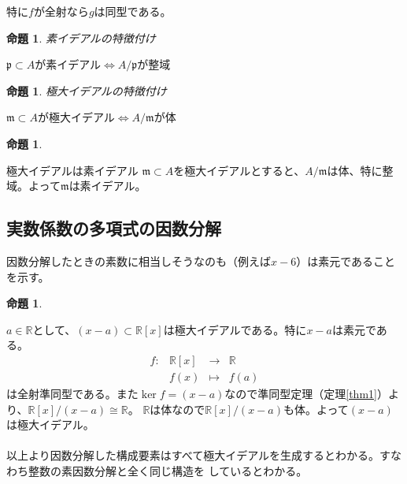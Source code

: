 \documentclass{jsarticle}
\newtheorem{prop}[definition]{命題}
\begin{document}
特に$f$が全射なら$g$は同型である。
\begin{prop}
    素イデアルの特徴付け
\end{prop}
$\mathfrak{p}\subset A$が素イデアル$\Longleftrightarrow A/\mathfrak{p}$が整域
\begin{prop}
    極大イデアルの特徴付け
\end{prop}
$\mathfrak{m}\subset A$が極大イデアル$\Longleftrightarrow A/\mathfrak{m}$が体
\begin{prop}
\end{prop}
極大イデアルは素イデアル
\proof
$\mathfrak{m} \subset A$を極大イデアルとすると、$A/\mathfrak{m}$は体、特に整域。よって$\mathfrak{m}$は素イデアル。
\subsection{実数係数の多項式の因数分解}
因数分解したときの素数に相当しそうなのも（例えば$x-6$）は素元であることを示す。
\begin{prop}
\end{prop}
$a\in \mathbb{R}$として、$(x-a)\subset \mathbb{R}[x]$は極大イデアルである。特に$x-a$は素元である。
\proof
\begin{equation*}
    \begin{array}{rccc}
        f\colon &\mathbb{R}[x] &\longrightarrow & \mathbb{R}\\
                  &f(x) & \longmapsto    &f(a)
    \end{array}
\end{equation*}
は全射準同型である。また$\ker{f}=(x-a)$なので準同型定理（定理\ref{thm1}）より、$\mathbb{R}[x]/(x-a)\cong \mathbb{R}$。
$\mathbb{R}$は体なので$\mathbb{R}[x]/(x-a)$も体。よって$(x-a)$は極大イデアル。\\
\\
以上より因数分解した構成要素はすべて極大イデアルを生成するとわかる。すなわち整数の素因数分解と全く同じ構造を
しているとわかる。
\end{document}
